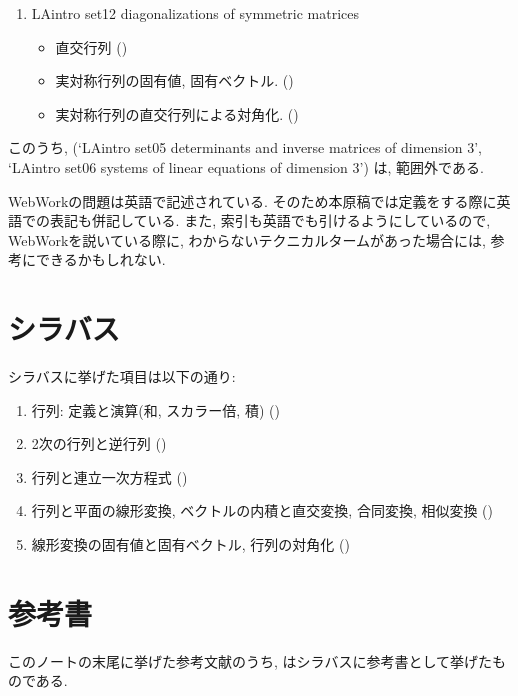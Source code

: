 \begin{enumerate}
\begin{itemize}
  \item 三項間漸化式への応用 ()
  \end{itemize}
\item
  LAintro set12 diagonalizations of symmetric matrices
  \begin{itemize}
  \item 直交行列 ()
  \item 実対称行列の固有値, 固有ベクトル. ()
  \item 実対称行列の直交行列による対角化. ()
  \end{itemize}
\end{enumerate}

このうち,
(`LAintro set05 determinants and inverse matrices of dimension 3',
`LAintro set06 systems of linear equations of dimension 3')
は,
範囲外である.



WebWorkの問題は英語で記述されている.
そのため本原稿では定義をする際に英語での表記も併記している.
また, 索引も英語でも引けるようにしているので,
WebWorkを説いている際に,
わからないテクニカルタームがあった場合には,
参考にできるかもしれない.

\section{シラバス}
シラバスに挙げた項目は以下の通り:
\begin{enumerate}
\item
 行列: 定義と演算(和, スカラー倍, 積)
 ()
\item
2次の行列と逆行列
()
\item
行列と連立一次方程式
()
\item
行列と平面の線形変換, ベクトルの内積と直交変換, 合同変換, 相似変換
()
\item
 線形変換の固有値と固有ベクトル, 行列の対角化
 ()
\end{enumerate}

\section{参考書}
このノートの末尾に挙げた参考文献のうち,
\cite{978-4-7806-0772-7,978-4-7806-0164-0,978-4-535-78682-0}
はシラバスに参考書として挙げたものである.

